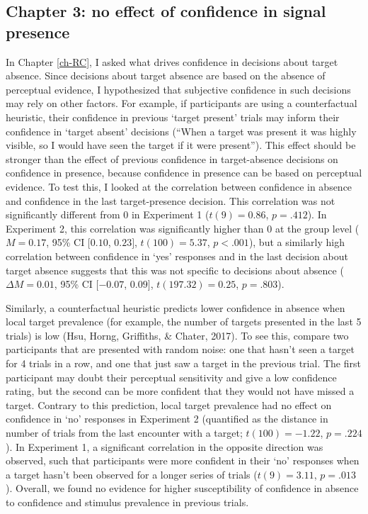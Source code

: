 \documentclass[12pt,twoside]{reedthesis}
\begin{document}
\hypertarget{chapter-3-no-effect-of-confidence-in-signal-presence}{%
\subsection*{Chapter 3: no effect of confidence in signal presence}\label{chapter-3-no-effect-of-confidence-in-signal-presence}}

In Chapter \ref{ch-RC}, I asked what drives confidence in decisions about target absence. Since decisions about target absence are based on the absence of perceptual evidence, I hypothesized that subjective confidence in such decisions may rely on other factors. For example, if participants are using a counterfactual heuristic, their confidence in previous `target present' trials may inform their confidence in `target absent' decisions (``When a target was present it was highly visible, so I would have seen the target if it were present''). This effect should be stronger than the effect of previous confidence in target-absence decisions on confidence in presence, because confidence in presence can be based on perceptual evidence. To test this, I looked at the correlation between confidence in absence and confidence in the last target-presence decision. This correlation was not significantly different from 0 in Experiment 1 (\(t(9) = 0.86\), \(p = .412\)). In Experiment 2, this correlation was significantly higher than 0 at the group level (\(M = 0.17\), 95\% CI \([0.10\), \(0.23]\), \(t(100) = 5.37\), \(p < .001\)), but a similarly high correlation between confidence in `yes' responses and in the last decision about target absence suggests that this was not specific to decisions about absence (\(\Delta M = 0.01\), 95\% CI \([-0.07\), \(0.09]\), \(t(197.32) = 0.25\), \(p = .803\)).

Similarly, a counterfactual heuristic predicts lower confidence in absence when local target prevalence (for example, the number of targets presented in the last 5 trials) is low (Hsu, Horng, Griffiths, \& Chater, 2017). To see this, compare two participants that are presented with random noise: one that hasn't seen a target for 4 trials in a row, and one that just saw a target in the previous trial. The first participant may doubt their perceptual sensitivity and give a low confidence rating, but the second can be more confident that they would not have missed a target. Contrary to this prediction, local target prevalence had no effect on confidence in `no' responses in Experiment 2 (quantified as the distance in number of trials from the last encounter with a target; \(t(100) = -1.22\), \(p = .224\)). In Experiment 1, a significant correlation in the opposite direction was observed, such that participants were more confident in their `no' responses when a target hasn't been observed for a longer series of trials (\(t(9) = 3.11\), \(p = .013\)). Overall, we found no evidence for higher susceptibility of confidence in absence to confidence and stimulus prevalence in previous trials.
\end{document}
